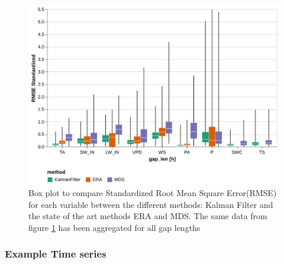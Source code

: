 \documentclass{article}
\newcommand{\imgwidth}{6in}
\begin{document}
\begin{figure}
    \centerline{\includegraphics[width=\imgwidth]{the_plot_stand}}
\caption{Box plot to compare Standardized Root Mean Square Error(RMSE) for each variable between the different methods: Kalman Filter and the state of the art methods ERA and MDS. The same data from figure \ref{fig:the_plot} has been aggregated for all gap lengths}
\label{fig:the_plot}
\end{figure}





\subsubsection{Example Time series}
\end{document}
